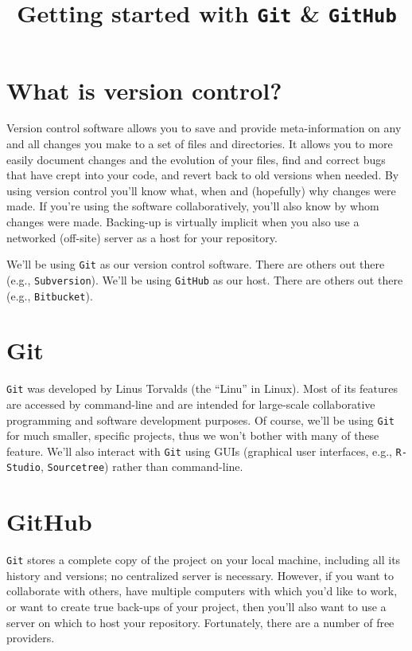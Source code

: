 \documentclass[12pt,letterpaper]{article}
\author{}
\title{Getting started with \texttt{Git} \& \texttt{GitHub}}
\date{}
\begin{document}
\maketitle

\tableofcontents

\pagebreak


\section{What is version control?}
Version control software allows you to save and provide meta-information on any and all changes you make to a set of files and directories.
It allows you to more easily document changes and the evolution of your files, find and correct bugs that have crept into your code, and revert back to old versions when needed.
By using version control you'll know what, when and (hopefully) why changes were made.
If you're using the software collaboratively, you'll also know by whom changes were made.
Backing-up is virtually implicit when you also use a networked (off-site) server as a host for your repository.

We'll be using \texttt{Git} as our version control software.
There are others out there (e.g., \texttt{Subversion}).
We'll be using \texttt{GitHub} as our host.
There are others out there (e.g., \texttt{Bitbucket}).

\section{Git}
\texttt{Git} was developed by Linus Torvalds (the ``Linu'' in Linux).
Most of its features are accessed by command-line and are intended for large-scale collaborative programming and software development purposes.
Of course, we'll be using \texttt{Git} for much smaller, specific projects, thus we won't bother with many of these feature.
We'll also interact with \texttt{Git} using GUIs (graphical user interfaces, e.g., \texttt{R-Studio}, \texttt{Sourcetree}) rather than command-line.


\section{GitHub}
\texttt{Git} stores a complete copy of the project on your local machine, including all its history and versions; no centralized server is necessary.
However, if you want to collaborate with others, have multiple computers with which you'd like to work, or want to create true back-ups of your project, then you'll also want to use a server on which to host your repository.
Fortunately, there are a number of free providers.
\end{document}
